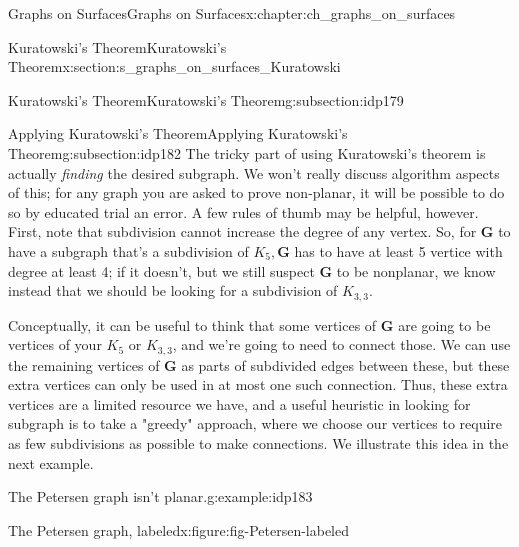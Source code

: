 \documentclass[oneside,10pt,]{book}
\numberwithin{equation}{section}
\newcommand{\bfG}{\mathbf{G}}
\begin{document}
\begin{chapterptx}{Graphs on Surfaces}{}{Graphs on Surfaces}{}{}{x:chapter:ch_graphs_on_surfaces}
\begin{sectionptx}{Kuratowski's Theorem}{}{Kuratowski's Theorem}{}{}{x:section:s_graphs_on_surfaces_Kuratowski}
\begin{subsectionptx}{Kuratowski's Theorem}{}{Kuratowski's Theorem}{}{}{g:subsection:idp179}
\end{subsectionptx}
%
%
\typeout{************************************************}
\typeout{************************************************}
%
\begin{subsectionptx}{Applying Kuratowski's Theorem}{}{Applying Kuratowski's Theorem}{}{}{g:subsection:idp182}
The tricky part of using Kuratowski's theorem is actually \emph{finding} the desired subgraph.  We won't really discuss algorithm aspects of this; for any graph you are asked to prove non-planar, it will be possible to do so by educated trial an error.  A few rules of thumb may be helpful, however.  First, note that subdivision cannot increase the degree of any vertex.  So, for \(\bfG\) to have a subgraph that's a subdivision of \(K_5, \bfG\) has to have at least 5 vertice with degree at least 4; if it doesn't, but we still suspect \(\bfG\) to be nonplanar, we know instead that we should be looking for a subdivision of \(K_{3,3}\).%
\par
Conceptually, it can be useful to think that some vertices of \(\bfG\) are going to be vertices of your \(K_5\) or \(K_{3,3}\), and we're going to need to connect those.  We can use the remaining vertices of \(\bfG\) as parts of subdivided edges between these, but these extra vertices can only be used in at most one such connection.  Thus, these extra vertices are a limited resource we have, and a useful heuristic in looking for subgraph is to take a "greedy" approach, where we choose our vertices to require as few subdivisions as possible to make connections.  We illustrate this idea in the next example.%
\begin{example}{The Petersen graph isn't planar.}{g:example:idp183}%
\begin{figureptx}{The Petersen graph, labeled}{x:figure:fig-Petersen-labeled}{}%
\begin{image}{0.05}{0.9}{0.05}%
\end{image}
\end{figureptx}
\end{example}
\end{subsectionptx}
\end{sectionptx}
\end{chapterptx}
\end{document}
